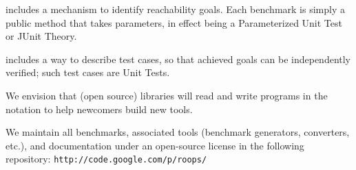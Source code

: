  includes a mechanism to identify reachability goals. 
Each  benchmark is simply a public method that takes parameters,
in effect being a Parameterized Unit Test\cite{} or JUnit Theory\cite{}.

 includes a way to describe test cases, 
so that achieved goals can be independently verified;
such test cases are Unit Tests\cite{}.

We envision that (open source) libraries will read and write programs in the
 notation to help newcomers build new tools.

We maintain all  benchmarks, associated tools (benchmark generators, 
converters, etc.), and documentation under an open-source license in the
following repository:
\verb|http://code.google.com/p/roops/|
